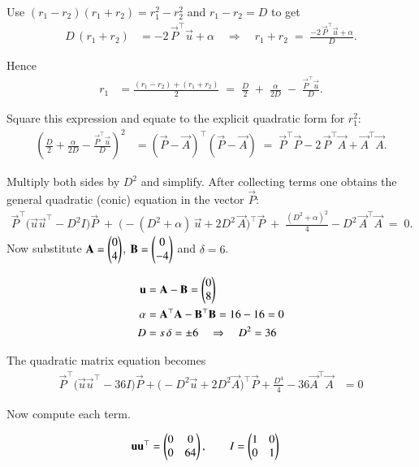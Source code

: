 \documentclass[journal]{IEEEtran}
\begin{document}
Use $(r_1-r_2)(r_1+r_2)=r_1^2-r_2^2$ and $r_1-r_2 = D$ to get
\begin{align}
    D\,(r_1+r_2) &= -2\,\vec{P}^\top\vec{u} + \alpha
    \quad\Longrightarrow\quad
    r_1+r_2 \;=\; \frac{-2\,\vec{P}^\top\vec{u} + \alpha}{D}.
\end{align}

Hence
\begin{align}
    r_1 &= \frac{(r_1-r_2)+(r_1+r_2)}{2}
        \;=\; \frac{D}{2} \;+\; \frac{\alpha}{2D} \;-\; \frac{\vec{P}^\top\vec{u}}{D}.
\end{align}

Square this expression and equate to the explicit quadratic form for $r_1^2$:
\begin{align}
    \left(\frac{D}{2} + \frac{\alpha}{2D} - \frac{\vec{P}^\top\vec{u}}{D}\right)^2
    &= (\vec{P}-\vec{A})^\top(\vec{P}-\vec{A})
    \;=\; \vec{P}^\top\vec{P} - 2\,\vec{P}^\top\vec{A} + \vec{A}^\top\vec{A}.
\end{align}

Multiply both sides by $D^2$ and simplify.  After collecting terms one obtains the general quadratic (conic) equation in the vector \(\vec{P}\):
\begin{align}
    \vec{P}^\top\big(\vec{u}\vec{u}^\top - D^2 I\big)\vec{P}
    \;+\;
    \big(-(D^2+\alpha)\,\vec{u} + 2D^2\,\vec{A}\big)^\top \vec{P}
    \;+\;
    \frac{(D^2+\alpha)^2}{4} - D^2\,\vec{A}^\top\vec{A}
    \;=\; 0.
\end{align}
Now substitute $\mathbf{A}=\begin{pmatrix}0\\4\end{pmatrix}$, $\mathbf{B}=\begin{pmatrix}0\\-4\end{pmatrix}$ and $\delta=6$.

\begin{align}
    \mathbf{u} &= \mathbf{A}-\mathbf{B} = \begin{pmatrix}0\\8\end{pmatrix} \\
    \alpha &= \mathbf{A}^\top\mathbf{A} - \mathbf{B}^\top\mathbf{B} = 16 - 16 = 0 \\
    D &= s\,\delta = \pm 6 \quad\Rightarrow\quad D^2 = 36
\end{align}

The quadratic matrix equation becomes
\begin{align}
    \vec{P}^\top\big(\vec{u}\vec{u}^\top - 36I\big)\vec{P}
    + \big(-D^2\vec{u} + 2D^2\vec{A}\big)^\top \vec{P}
    + \frac{D^4}{4} - 36\vec{A}^\top\vec{A} &= 0
\end{align}

Now compute each term.

\begin{align}
    \mathbf{u}\mathbf{u}^\top &= \begin{pmatrix}0 & 0 \\ 0 & 64\end{pmatrix}, \qquad
    I = \begin{pmatrix}1 & 0 \\ 0 & 1\end{pmatrix}
\end{align}
\end{document}
